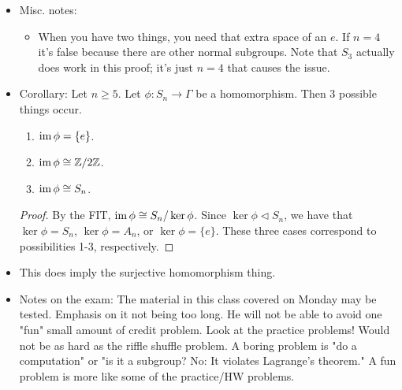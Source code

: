 \documentclass[../notes.tex]{subfiles}
\begin{document}
\begin{itemize}
\begin{proof}
        Note: $(1,\dots,k)=(1,2)(1,3)\cdots(1,k)$.\par
        1: $A_n$ is generated by all products of two 2-cycles. Three cases:
        \begin{align*}
            (a,b)(c,d) &= (c,a,d)(a,b,c)\\
            (a,b)(a,c) &= (a,c,b)\\
            (a,b)(a,b) &= e
        \end{align*}
        3: We want $H\triangleleft S_n$. We know that if $(xxx)\in H$, then $A_n\triangleleft H$.\par
        Case 1: $\sigma\in H$ with $\sigma=(xxx\cdots x)(xx)(xxx)\dots$ (i.e., at least one component $k$-cycle satisfies $k\geq 3$). Implies that we can generate a three cycle by the $n$-cycles implies 3-cycles approach.\par
        Case 2: $\sigma=(xx)(xx)\cdots(xx)$ ($\sigma$ is a product of disjoint two cycles; "the only thing left" after case 1). Subcase 0: $\sigma=(ab)$. Implies $H=S_n$. Subcase 1: $\sigma=(ab)(cd)$. Multiply by $(a,b)(c,e)$ to get $(c,e,d)$. Subcase 2: $\sigma=(a,b)(c,d)(e,f)\cdots$. Choose $(a,c)(b,e)(d,f)$. Then $(a,b)(c,d)(e,f)\cdot(a,c)(b,e)(d,f)=(a,d,e)(b,f,c)$. We've reduced to the previous case at this point, i.e., we can now get it to $(a,d,e)$.
    \end{proof}
    \item Misc. notes:
    \begin{itemize}
        \item When you have two things, you need that extra space of an $e$. If $n=4$ it's false because there are other normal subgroups. Note that $S_3$ actually does work in this proof; it's just $n=4$ that causes the issue.
    \end{itemize}
    \item Corollary: Let $n\geq 5$. Let $\phi:S_n\to\Gamma$ be a homomorphism. Then 3 possible things occur.
    \begin{enumerate}
        \item $\operatorname{im}\phi=\{e\}$.
        \item $\operatorname{im}\phi\cong\mathbb{Z}/2\mathbb{Z}$.
        \item $\operatorname{im}\phi\cong S_n$.
    \end{enumerate}
    \begin{proof}
        By the FIT, $\operatorname{im}\phi\cong S_n/\ker\phi$. Since $\ker\phi\triangleleft S_n$, we have that $\ker\phi=S_n$, $\ker\phi=A_n$, or $\ker\phi=\{e\}$. These three cases correspond to possibilities 1-3, respectively.
    \end{proof}
    \item This does imply the surjective homomorphism thing.
    \item Notes on the exam: The material in this class covered on Monday may be tested. Emphasis on it not being too long. He will not be able to avoid one "fun" small amount of credit problem. Look at the practice problems! Would not be as hard as the riffle shuffle problem. A boring problem is "do a computation" or "is it a subgroup? No: It violates Lagrange's theorem." A fun problem is more like some of the practice/HW problems.
\end{itemize}
\end{document}
